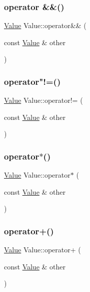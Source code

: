 \subsubsection{\texorpdfstring{operator \&\&()}{operator \&\&()}}
{\footnotesize\ttfamily \hyperlink{classValue}{Value} Value\+::operator\&\& (\begin{DoxyParamCaption}\item[{const \hyperlink{classValue}{Value} \&}]{other }\end{DoxyParamCaption})}

\mbox{\label{classValue_a9ad57dde72c068377e6da67caec558a3}} 
\subsubsection{\texorpdfstring{operator"!=()}{operator!=()}}
{\footnotesize\ttfamily \hyperlink{classValue}{Value} Value\+::operator!= (\begin{DoxyParamCaption}\item[{const \hyperlink{classValue}{Value} \&}]{other }\end{DoxyParamCaption})}

\mbox{\label{classValue_a8c1b2b5806fbf5d37d0b8bb2ec1ac584}} 
\subsubsection{\texorpdfstring{operator$\ast$()}{operator*()}}
{\footnotesize\ttfamily \hyperlink{classValue}{Value} Value\+::operator$\ast$ (\begin{DoxyParamCaption}\item[{const \hyperlink{classValue}{Value} \&}]{other }\end{DoxyParamCaption})}

\mbox{\label{classValue_a59e467d3ee4cdfb802a2aed8a5a0f1dd}} 
\subsubsection{\texorpdfstring{operator+()}{operator+()}}
{\footnotesize\ttfamily \hyperlink{classValue}{Value} Value\+::operator+ (\begin{DoxyParamCaption}\item[{const \hyperlink{classValue}{Value} \&}]{other }\end{DoxyParamCaption})}

